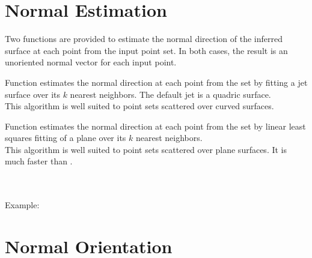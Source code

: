 \section{Normal Estimation}

Two functions are provided to estimate the normal direction of the inferred surface at each point from the input point set. In both cases, the result is an unoriented normal vector for each input point.

Function  estimates the normal direction at each point from the set by fitting a jet surface over its $k$ nearest neighbors. The default jet is a quadric surface.\\
This algorithm is well suited to point sets scattered over curved surfaces.

Function  estimates the normal direction at each point from the set by linear least squares fitting of a plane over its $k$ nearest neighbors.\\
This algorithm is well suited to point sets scattered over plane surfaces. It is much faster than .

  \\
  \\


Example:



\section{Normal Orientation}

